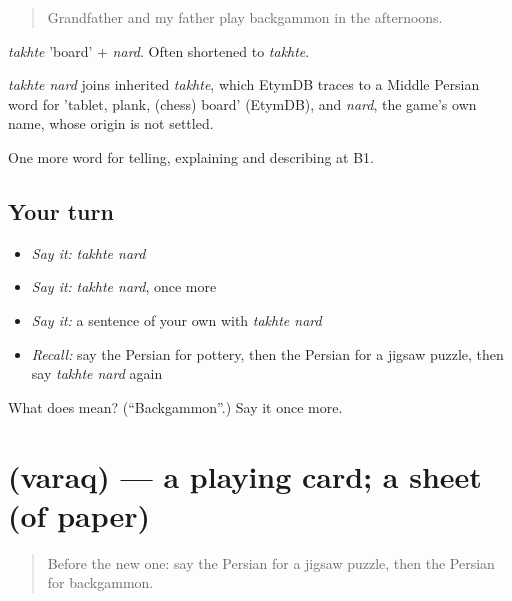 \begin{quote}
Grandfather and my father play backgammon in the afternoons.
\end{quote}

\emph{takhte} 'board' + \emph{nard}. Often shortened to \emph{takhte}.

\begin{cousinweb}
\emph{takhte nard} joins inherited \emph{takhte}, which EtymDB traces to a Middle Persian word for 'tablet, plank, (chess) board' (EtymDB), and \emph{nard}, the game's own name, whose origin is not settled.
\end{cousinweb}

\begin{grammarlens}[title={What you've built}]
One more word for telling, explaining and describing at B1.
\end{grammarlens}

\subsection*{Your turn}
\begin{itemize}
\raggedright
  \item \emph{Say it:} \emph{takhte nard}
  \item \emph{Say it:} \emph{takhte nard}, once more
  \item \emph{Say it:} a sentence of your own with \emph{takhte nard}
  \item \emph{Recall:} say the Persian for pottery, then the Persian for a jigsaw puzzle, then say \emph{takhte nard} again
\end{itemize}

\begin{tcolorbox}[breakable,colback=teal!4,colframe=teal!35!black,title={Before you move on}]
What does   mean? (\textquotedblleft{}Backgammon\textquotedblright{}.) Say it once more.
\end{tcolorbox}
\section[\texorpdfstring{\fa{ورق} (varaq)}{ورق (varaq)}]{ (varaq) — a playing card; a sheet (of paper)}

\label{lesson:FA-C509-varaq}



\begin{quote}
Before the new one: say the Persian for a jigsaw puzzle, then the Persian for backgammon.
\end{quote}

